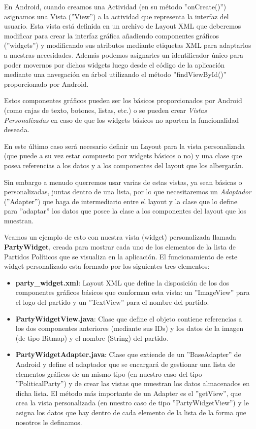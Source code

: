 		En Android, cuando creamos una Actividad (en su método ''onCreate()'') asignamos una Vista (''View'') a la actividad que representa la interfaz del usuario. Esta vista está definida en un archivo de Layout XML que deberemos modificar para crear la interfaz gráfica añadiendo componentes gráficos \cite{ref:android_widget} (''widgets'') y modificando sus atributos mediante etiquetas XML para adaptarlos a nuestras necesidades. Además podemos asignarles un identificador único para poder movernos por dichos widgets luego desde el código de la aplicación mediante una navegación en árbol utilizando el método ''findViewById()'' proporcionado por Android. 
		
		Estos componentes gráficos pueden ser los básicos proporcionados por Android (como cajas de texto, botones, listas, etc.) o se pueden crear \textit{Vistas Personalizadas} en caso de que los widgets básicos no aporten la funcionalidad deseada.
		
		En este último caso será necesario definir un Layout para la vista personalizada (que puede a su vez estar compuesto por widgets básicos o no) y una clase que posea referencias a los datos y a los componentes del layout que los albergarán.
		
		Sin embargo a menudo querremos usar varias de estas vistas, ya sean básicas o personalizadas, juntas dentro de una lista,  por lo que necesitaremos un \textit{Adaptador}\cite{ref:android_adapter} (''Adapter'') que haga de intermediario entre el layout y la clase que lo define para ''adaptar'' los datos que posee la clase a los componentes del layout que los muestran. 
		
		Veamos un ejemplo de esto con nuestra vista (widget) personalizada llamada \textbf{PartyWidget}, creada para mostrar cada uno de los elementos de la lista de Partidos Políticos que se visualiza en la aplicación. El funcionamiento de este widget personalizado esta formado por los siguientes tres elementos:
		
		\begin{itemize}
			\item \textbf{party\_widget.xml}: Layout XML que define la disposición de los dos componentes gráficos básicos que conforman esta vista: un ''ImageView'' para el logo del partido y un ''TextView'' para el nombre del partido.
			\item \textbf{PartyWidgetView.java}: Clase que define el objeto contiene referencias a los dos componentes anteriores (mediante sus IDs) y los datos de la imagen (de tipo Bitmap) y el nombre (String) del partido.
			\item \textbf{PartyWidgetAdapter.java}: Clase que extiende de un ''BaseAdapter'' de Android y define el adaptador que se encargará de gestionar una lista de elementos gráficos de un mismo tipo (en nuestro caso del tipo ''PoliticalParty'') y de crear las vistas que muestran los datos almacenados en dicha lista. El método más importante de un Adapter es el ''getView'', que crea la vista personalizada (en nuestro caso de tipo ''PartyWidgetView'') y le asigna los datos que hay dentro de cada elemento de la lista de la forma que nosotros le definamos. 
		\end{itemize}
		
